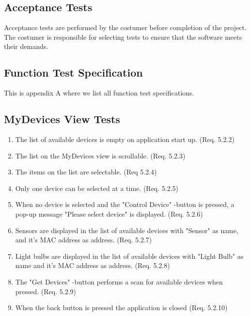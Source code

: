 \documentclass[a4paper]{article}
\newlength{\testlabellength}
\newenvironment{testlist}{\begin{enumerate}[label=\bfseries Test \thesubsection.\arabic* , labelindent=0pt, labelwidth=\testlabellength , leftmargin=2cm]}{\end{enumerate}}
\begin{document}
\subsection{Acceptance Tests}
Acceptance tests are performed by the costumer before completion of the project. The costumer is responsible for selecting tests to ensure that the software meets their demands.

\newpage
\begin{appendices}

\section{Function Test Specification} \label{appendix:section:functiontest}
This is appendix A where we list all function test specifications.

\subsection{MyDevices View Tests}
\begin{testlist}
	\item The list of available devices is empty on application start up. (Req. 5.2.2)
    \item The list on the MyDevices view is scrollable. (Req. 5.2.3)
   
    \item The items on the list are selectable. (Req 5.2.4)
    \item Only one device can be selected at a time. (Req. 5.2.5)
    \item When no device is selected and the "Control Device" -button is pressed, a pop-up message "Please select device" is displayed. (Req. 5.2.6)
    \item Sensors are displayed in the list of available devices with "Sensor" as name, and it's MAC address as address. (Req. 5.2.7)
    \item Light bulbs are displayed in the list of available devices with "Light Bulb" as name and it's MAC address as address. (Req. 5.2.8)
    \item The "Get Devices" -button performs a scan for available devices when pressed. (Req. 5.2.9)
    \item When the back button is pressed the application is closed (Req. 5.2.10)
\end{testlist}


\end{appendices}
\end{document}
